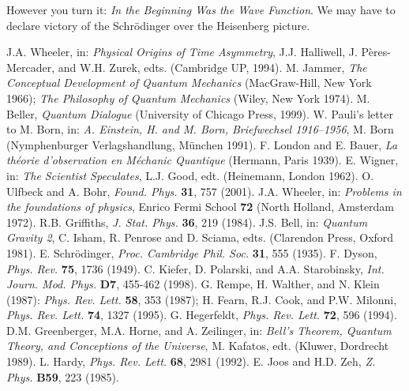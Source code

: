 \documentclass[12pt]{article}
\begin{document}
However you turn it: {\it In the Beginning Was the Wave Function}.
We may have to declare victory of the Schr\"odinger over the
Heisenberg picture.

 
\begin{thebibliography}{99}

J.A. Wheeler, in: {\it Physical Origins of Time Asymmetry}, J.J.
Halliwell, J. P\`eres-Mercader, and W.H. Zurek, edts. (Cambridge UP,
1994).
    M. Jammer, {\em The Conceptual Development of Quantum Mechanics}
(MacGraw-Hill, New York 1966); {\em The Philosophy of Quantum
Mechanics} (Wiley, New York 1974).
    M. Beller, {\em Quantum Dialogue} (University of Chicago Press,
1999).
W. Pauli's letter to M. Born, in: {\it A. Einstein, H. and M. Born,
   Briefwechsel 1916--1956}, M. Born  (Nymphenburger Verlagshandlung,
M\"unchen 1991).
    F. London and E. Bauer, {\em La th\'eorie d'observation en
M\'echanic Quantique} (Hermann, Paris 1939).
    E. Wigner, in: {\it The Scientist
Speculates}, L.J. Good, edt. (Heinemann, London 1962).
O. Ulfbeck and A. Bohr,
{\it Found. Phys.} {\bf 31}, 757 (2001).
J.A. Wheeler, in: {\it Problems in the foundations of physics}, Enrico
Fermi School {\bf 72} (North Holland, Amsterdam 1972).
R.B. Griffiths,
{\it J. Stat. Phys.}
   {\bf 36}, 219 (1984).
J.S. Bell,
  in: {\it Quantum Gravity 2}, C. Isham, R. Penrose and D. Sciama, edts.
(Clarendon Press, Oxford 1981).
E. Schr\"odinger,
{\it Proc. Cambridge Phil. Soc.}  {\bf 31}, 555 (1935).
F. Dyson,
{\it Phys. Rev.} {\bf 75}, 1736 (1949).
C. Kiefer, D. Polarski, and A.A. Starobinsky, {\it Int. Journ. Mod.
Phys.} {\bf D7}, 455-462 (1998).
G. Rempe, H. Walther,  and N. Klein (1987):
{\it Phys. Rev. Lett.} {\bf 58}, 353 (1987);  H. Fearn, R.J. Cook,
  and P.W. Milonni,
{\it Phys. Rev. Lett.} {\bf 74}, 1327 (1995).
G. Hegerfeldt,
{\it Phys. Rev. Lett.}  {\bf 72}, 596 (1994).
D.M. Greenberger, M.A. Horne, and A. Zeilinger, in: {\it Bell's
Theorem, Quantum Theory, and Conceptions of the Universe}, M.
Kafatos, edt. (Kluwer, Dordrecht 1989).
L. Hardy, {\it Phys. Rev. Lett.} {\bf 68}, 2981 (1992).
E. Joos and H.D. Zeh,
{\it Z. Phys.} {\bf B59}, 223 (1985).

\end{thebibliography}
\end{document}
